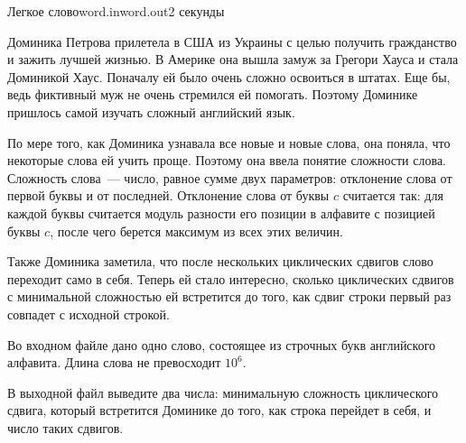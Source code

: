 \begin{problem}{Легкое слово}{word.in}{word.out}{2 секунды}


Доминика Петрова прилетела в США из Украины с целью получить гражданство и зажить лучшей жизнью.
В Америке она вышла замуж за Грегори Хауса и стала Доминикой Хаус. Поначалу ей было очень сложно 
освоиться в штатах. Еще бы, ведь фиктивный муж не очень стремился ей помогать. Поэтому Доминике
пришлось самой изучать сложный английский язык.

По мере того, как Доминика узнавала все новые и новые слова, она поняла, что некоторые слова ей учить проще.
Поэтому она ввела понятие сложности слова. Сложность слова~--- число, равное сумме двух параметров: отклонение 
слова от первой буквы и от последней. Отклонение слова от буквы $c$ считается так: для каждой буквы
считается модуль разности его позиции в алфавите с позицией буквы $c$, после чего берется максимум 
из всех этих величин. 

Также Доминика заметила, что после нескольких циклических сдвигов слово переходит само в себя. Теперь ей
стало интересно, сколько циклических сдвигов с минимальной сложностью ей встретится до того, как сдвиг
строки первый раз совпадет с исходной строкой.

\InputFile
Во входном файле дано одно слово, состоящее из строчных букв английского алфавита. Длина слова не 
превосходит $10^6$.

\OutputFile               
В выходной файл выведите два числа: минимальную сложность циклического сдвига, который встретится Доминике до
того, как строка перейдет в себя, и число таких сдвигов.

\Examples
\begin{example}%
%
\end{example}


\end{problem}
